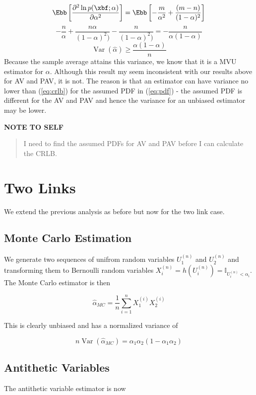 \documentclass[10pt]{article}
\DeclareMathOperator{\var}{Var}
\begin{document}
\[
\Ebb\left[\frac{\partial^2\ln p(\xbf;\alpha)}{\partial\alpha^2}\right] = \Ebb\left[-\frac{m}{\alpha^2} + \frac{(m-n)}{(1-\alpha)^2}\right]
\]
\[
-\frac{n}{\alpha}+\frac{n\alpha}{(1-\alpha)^2)}-\frac{n}{(1-\alpha)^2)}=-\frac{n}{\alpha(1-\alpha)}
\]
\begin{equation}
\var\left(\hat{\alpha}\right) \geq \frac{\alpha(1-\alpha)}{n}\label{eq:crlb}
\end{equation}
Because the sample average attains this variance, we know that it is a \ac{MVU} estimator for $\alpha$. Although this result my seem inconsistent with our results above for \ac{AV} and \ac{PAV}, it is not. The reason is that an estimator can have variance no lower than (\ref{eq:crlb}) for the assumed \ac{PDF} in (\ref{eq:pdf}) - the assumed \ac{PDF} is different for the \ac{AV} and \ac{PAV} and hence the variance for an unbiased estimator may be lower.

\textbf{NOTE TO SELF}
\begin{quote}
I need to find the assumed \ac{PDF}s for \ac{AV} and \ac{PAV} before I can calculate the \ac{CRLB}.
\end{quote}

\section{Two Links}
We extend the previous analysis as before but now for the two link case.
\subsection{Monte Carlo Estimation}
We generate two sequences of unifrom random variables $U_{1}^{(n)}$ and $U_{2}^{(n)}$ and transforming them to Bernoulli random variables $X_{i}^{(n)} = h(U_{i}^{(n)}) = \mathbb{I}_{U_{i}^{(n)} < \alpha_i}$. The Monte Carlo estimator is then

\begin{equation}
\hat{\alpha}_{MC} = \frac{1}{n}\displaystyle\sum_{i=1}^{n}X_{1}^{(i)}X_{2}^{(i)}
\end{equation}

This is clearly unbiased and has a normalized variance of

\begin{equation}
n\var\left(\hat{\alpha}_{MC}\right) = \alpha_1\alpha_2(1-\alpha_1\alpha_2)
\end{equation}

\subsection{Antithetic Variables}
The antithetic variable estimator is now
\end{document}
